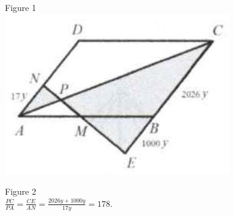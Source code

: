 \documentclass{article}
\begin{document}
Figure 1\\
\centering
\includegraphics[width=\textwidth]{images/142.jpg}

Figure 2\\
\(\frac{P C}{P A}=\frac{C E}{A N}=\frac{2026 y+1000 y}{17 y}=178\).
\end{document}
